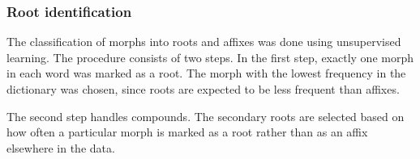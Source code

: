 \subsubsection{Root identification}

The classification of morphs into roots and affixes was done using unsupervised learning. The procedure consists of two steps. In the first step, exactly one morph in each word was marked as a root. The morph with the lowest frequency in the dictionary was chosen, since roots are expected to be less frequent than affixes.

The second step handles compounds. The secondary roots are selected based on how often a particular morph is marked as a root rather than as an affix elsewhere in the data.